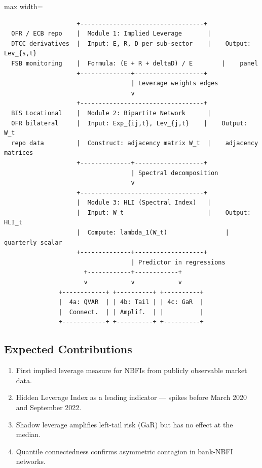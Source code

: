 \documentclass[11pt,a4paper]{article}
\begin{document}
\begin{adjustbox}{max width=\textwidth}
\begin{minipage}{1.5\textwidth}
\begin{verbatim}
                    +----------------------------------+
  OFR / ECB repo    |  Module 1: Implied Leverage       |
  DTCC derivatives  |  Input: E, R, D per sub-sector    |    Output: Lev_{s,t}
  FSB monitoring    |  Formula: (E + R + deltaD) / E        |    panel
                    +--------------+-------------------+
                                   | Leverage weights edges
                                   v
                    +----------------------------------+
  BIS Locational    |  Module 2: Bipartite Network      |
  OFR bilateral     |  Input: Exp_{ij,t}, Lev_{j,t}    |    Output: W_t
  repo data         |  Construct: adjacency matrix W_t  |    adjacency matrices
                    +--------------+-------------------+
                                   | Spectral decomposition
                                   v
                    +----------------------------------+
                    |  Module 3: HLI (Spectral Index)   |
                    |  Input: W_t                       |    Output: HLI_t
                    |  Compute: lambda_1(W_t)                |    quarterly scalar
                    +--------------+-------------------+
                                   | Predictor in regressions
                      +------------+------------+
                      v            v            v
               +------------+ +----------+ +----------+
               |  4a: QVAR  | | 4b: Tail | | 4c: GaR  |
               |  Connect.  | | Amplif.  | |          |
               +------------+ +----------+ +----------+
\end{verbatim}
\end{minipage}
\end{adjustbox}


\subsection{Expected Contributions}

\begin{enumerate}
\item First implied leverage measure for NBFIs from publicly observable market data.
\item Hidden Leverage Index as a leading indicator --- spikes before March 2020 and September 2022.
\item Shadow leverage amplifies left-tail risk (GaR) but has no effect at the median.
\item Quantile connectedness confirms asymmetric contagion in bank-NBFI networks.

\end{enumerate}
\end{document}
